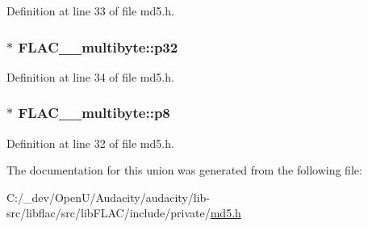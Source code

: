 Definition at line 33 of file md5.\+h.

\subsubsection[{\texorpdfstring{p32}{p32}}]{$\ast$ F\+L\+A\+C\+\_\+\+\_\+multibyte\+::p32}\hypertarget{union_f_l_a_c____multibyte_ae369d3df922bc4904c17f9fda0f33053}{}\label{union_f_l_a_c____multibyte_ae369d3df922bc4904c17f9fda0f33053}


Definition at line 34 of file md5.\+h.

\subsubsection[{\texorpdfstring{p8}{p8}}]{$\ast$ F\+L\+A\+C\+\_\+\+\_\+multibyte\+::p8}\hypertarget{union_f_l_a_c____multibyte_a0f2836974ec1451f08c2f3c30c578f16}{}\label{union_f_l_a_c____multibyte_a0f2836974ec1451f08c2f3c30c578f16}


Definition at line 32 of file md5.\+h.



The documentation for this union was generated from the following file\+:\begin{DoxyCompactItemize}
\item 
C\+:/\+\_\+dev/\+Open\+U/\+Audacity/audacity/lib-\/src/libflac/src/lib\+F\+L\+A\+C/include/private/\hyperlink{libflac_2src_2lib_f_l_a_c_2include_2private_2md5_8h}{md5.\+h}\end{DoxyCompactItemize}
